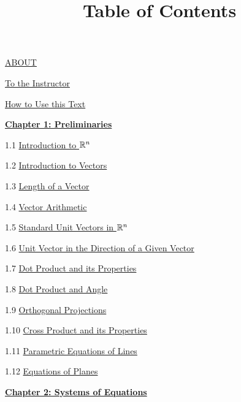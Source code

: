 \documentclass{ximera}
\title{Table of Contents} \license{CC BY-NC-SA 4.0}
\begin{document}
\begin{abstract}
\end{abstract}
\maketitle
	
\href{https://ximera.osu.edu/oerlinalg/LinearAlgebra/ABOUT/main}{ABOUT}
	
\href{https://ximera.osu.edu/oerlinalg/LinearAlgebra/toInstructor/main}{To the Instructor}
	
\href{https://ximera.osu.edu/oerlinalg/LinearAlgebra/HowToUse/main}{How to Use this Text}
	
\href{https://ximera.osu.edu/oerlinalg/LinearAlgebra/XLAChapter_prelim/main}{\textbf{Chapter 1: Preliminaries}}
	
1.1	\href{https://ximera.osu.edu/oerlinalg/LinearAlgebra/RRN-0010/main}{Introduction to $\mathbb{R}^n$}
	
1.2	\href{https://ximera.osu.edu/oerlinalg/LinearAlgebra/VEC-0010/main}{Introduction to Vectors}
	
1.3	\href{https://ximera.osu.edu/oerlinalg/LinearAlgebra/VEC-0020/main}{Length of a Vector}
	
1.4	\href{https://ximera.osu.edu/oerlinalg/LinearAlgebra/VEC-0030/main}{Vector Arithmetic}
	
1.5	\href{https://ximera.osu.edu/oerlinalg/LinearAlgebra/VEC-0035/main}{Standard Unit Vectors in $\mathbb{R}^n$}
	
1.6	\href{https://ximera.osu.edu/oerlinalg/LinearAlgebra/VEC-0036/main}{Unit Vector in the Direction of a Given Vector}
	
1.7	\href{https://ximera.osu.edu/oerlinalg/LinearAlgebra/VEC-0050/main}{Dot Product and its Properties}
	
1.8	\href{https://ximera.osu.edu/oerlinalg/LinearAlgebra/VEC-0060/main}{Dot Product and Angle }
	
1.9	\href{https://ximera.osu.edu/oerlinalg/LinearAlgebra/VEC-0070/main}{Orthogonal Projections}
	
1.10	\href{https://ximera.osu.edu/oerlinalg/LinearAlgebra/VEC-0080/main}{Cross Product and its Properties}
	
1.11	\href{https://ximera.osu.edu/oerlinalg/LinearAlgebra/RRN-0020/main}{Parametric Equations of Lines}
	
1.12	\href{https://ximera.osu.edu/oerlinalg/LinearAlgebra/RRN-0030/main}{Equations of Planes}
	
\href{https://ximera.osu.edu/oerlinalg/LinearAlgebra/XLAChapter_systems/main}{\textbf{Chapter 2: Systems of Equations}}
	
\end{document}
